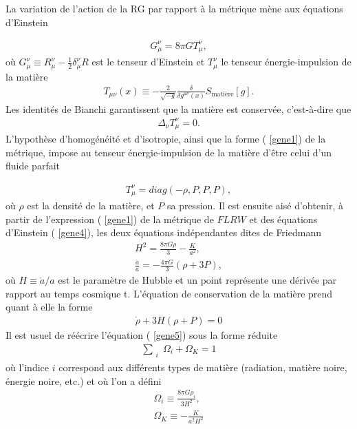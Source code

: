 \documentclass[a4paper,12pt]{report}
\theoremstyle{plain}
\theoremstyle{plain}
\begin{document}
La variation de l'action de la RG par rapport \`a la m\'etrique m\`ene aux \'equations d'Einstein

\begin{eqnarray}
 G_\mu^\nu = 8 \pi G T_\mu^\nu, \label{gene4}
\end{eqnarray}
o\`u $ G_\mu^\nu \equiv R_\mu^\nu - \frac{1}{2} \delta_\mu^\nu R  $ est le tenseur d'Einstein et $T_\mu^\nu $ le tenseur \'energie-impulsion de la
mati\`ere
\begin{eqnarray}
 T_{\mu \nu }(x) \equiv - \frac{2}{\sqrt{- g} }\frac{ \delta }{ \delta g^{\mu \nu } (x) } S_{\text{mati\`ere} } [g].
\end{eqnarray}
Les identit\'es de Bianchi garantissent que la mati\`ere est conserv\'ee, c'est-\`a-dire que
\begin{eqnarray}
 \Delta_\nu T_\mu^\nu = 0.
\end{eqnarray}
L'hypoth\`ese d'homog\'en\'eit\'e et d'isotropie, ainsi que la forme ( \ref{gene1}) de la m\'etrique, 
impose au tenseur \'energie-impulsion de la mati\`ere d'\^etre celui d'un fluide parfait
    
\begin{eqnarray}
 T_\mu^\nu = diag( -\rho, P, P, P),
\end{eqnarray}
o\`u $ \rho $ est la densit\'e de la mati\`ere, et $P$ sa pression. Il est ensuite ais\'e d'obtenir, \`a partir
de l'expression ( \ref{gene1}) de la m\'etrique de $FLRW$ et des \'equations d'Einstein ( \ref{gene4}), les deux
\'equations ind\'ependantes dites de Friedmann
\begin{eqnarray}
 H^2 = \frac{8 \pi G \rho }{ 3 } - \frac{K}{ a^2 }, \label{gene5} \\ \frac{\ddot{a }}{a } = -\frac{4 \pi G }{3} ( \rho + 3 P), \label{gene5'}
\end{eqnarray}
o\`u $ H \equiv \dot{a} / a $ est le param\`etre de Hubble et un point repr\'esente une d\'eriv\'ee par rapport au
temps cosmique t. L'\'equation de conservation de la mati\`ere prend quant \`a elle la forme
\begin{eqnarray}
 \dot{ \rho} + 3H(\rho + P) = 0 \label{gene6}
\end{eqnarray}
Il est usuel de r\'e\'ecrire l'\'equation ( \ref{gene5}) sous la forme r\'eduite
\begin{eqnarray}
 \sum_{\substack{i}} \Omega_i + \Omega_K = 1
\end{eqnarray}
o\`u l'indice $i$ correspond aux diff\'erents types de mati\`ere (radiation, mati\`ere noire, \'energie
noire, etc.) et o\`u l'on a d\'efini
\begin{eqnarray}
 \Omega_i \equiv \frac{8 \pi G \rho_i}{3 H^2},  \\ \Omega_K \equiv - \frac{K}{a^2 H^2}
\end{eqnarray}
\end{document}

